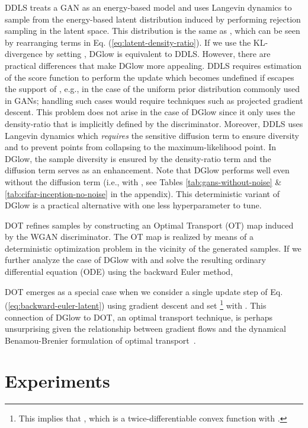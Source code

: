\documentclass{article} \usepackage{iclr2021_conference,times}
\newcommand{\ourmethod}{\textsc{DG}low}
\begin{document}
DDLS treats a GAN as an energy-based model and uses Langevin dynamics to sample from the energy-based latent distribution  induced by performing rejection sampling in the latent space. This distribution is the same as , which can be seen by rearranging terms in Eq. (\ref{eq:latent-density-ratio}). If we use the KL-divergence by setting  , \ourmethod{} is equivalent to DDLS. However, there are practical differences that make \ourmethod{} more appealing. DDLS requires estimation of the score function  to perform the update which becomes undefined if  escapes the support of , e.g., in the case of the uniform prior distribution commonly used in GANs; handling such cases would require techniques such as projected gradient descent. This problem does not arise in the case of \ourmethod{} since it only uses the density-ratio that is implicitly defined by the discriminator. Moreover, DDLS uses Langevin dynamics which \emph{requires} the sensitive diffusion term to ensure diversity and to prevent points from collapsing to the maximum-likelihood point. In \ourmethod{}, the sample diversity is ensured by the density-ratio term and the diffusion term serves as an enhancement. Note that \ourmethod{} performs well even without the diffusion term (i.e., with , see Tables \ref{tab:gans-without-noise} \& \ref{tab:cifar-inception-no-noise} in the appendix). This deterministic variant of \ourmethod{} is a practical alternative with one less hyperparameter to tune.


DOT refines samples by constructing an Optimal Transport (OT) map induced by the WGAN discriminator. The OT map is realized by means of a deterministic optimization problem in the vicinity of the generated samples.
If we further analyze the case of \ourmethod{} with  and solve the resulting ordinary differential equation (ODE) using the backward Euler method,

DOT emerges as a special case when we consider a single update step of Eq. (\ref{eq:backward-euler-latent}) using gradient descent and set \footnote{This implies that , which is a twice-differentiable convex function with .} with . This connection of \ourmethod{} to DOT, an optimal transport technique, is perhaps unsurprising given the relationship between gradient flows and the dynamical Benamou-Brenier formulation of optimal transport~\citep{santambrogio2017euclidean}.
 \vspace{-.8em}
\section{Experiments}
\vspace{-.8em}
\end{document}

